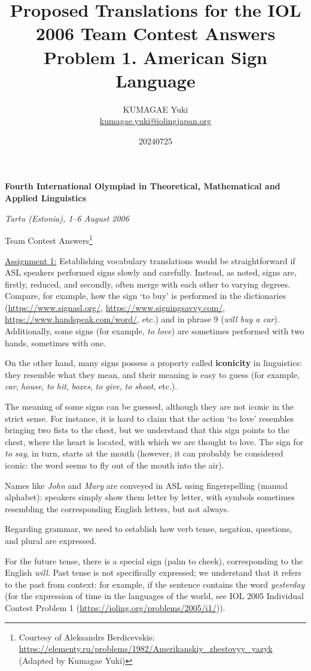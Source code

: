 \documentclass[12pt]{article}
\title{\Large Proposed Translations for the IOL 2006 Team Contest Answers\\\large Problem 1. American Sign Language}
\author{KUMAGAE Yuki\\
{\small\url{kumagae.yuki@iolingjapan.org}}}
\date{20240725}
\begin{document}
\pagestyle{empty}

\begin{center}
\textbf{Fourth International Olympiad in Theoretical, Mathematical and Applied Linguistics}

\textit{Tartu (Estonia), 1--6 August 2006}

Team Contest Answers\footnote{Courtesy of Aleksandrs Berdicevskis: \url{https://elementy.ru/problems/1982/Amerikanskiy_zhestovyy_yazyk} (Adapted by Kumagae Yuki)}
\end{center}

\noindent\underline{Assignment 1:}
Establishing vocabulary translations would be straightforward if ASL speakers performed signs slowly and carefully.
Instead, as noted, signs are, firstly, reduced, and secondly, often merge with each other to varying degrees.
Compare, for example, how the sign `to buy' is performed in the dictionaries (\url{https://www.signasl.org/}, \url{https://www.signingsavvy.com/}, \url{https://www.handspeak.com/word/}, etc.) and in phrase 9 (\textit{will buy a car}).
Additionally, some signs (for example, \textit{to love}) are sometimes performed with two hands, sometimes with one.

On the other hand, many signs possess a property called \textbf{iconicity} in linguistics:
they resemble what they mean, and their meaning is easy to guess (for example, \textit{car}, \textit{house}, \textit{to hit}, \textit{boxes}, \textit{to give}, \textit{to shoot}, etc.).

The meaning of some signs can be guessed, although they are not iconic in the strict sense.
For instance, it is hard to claim that the action `to love' resembles bringing two fists to the chest, but we understand that this sign points to the chest, where the heart is located, with which we are thought to love.
The sign for \textit{to say}, in turn, starts at the mouth (however, it can probably be considered iconic:
the word seems to fly out of the mouth into the air).

Names like \textit{John} and \textit{Mary} are conveyed in ASL using fingerspelling (manual alphabet):
speakers simply show them letter by letter, with symbols sometimes resembling the corresponding English letters, but not always.

Regarding grammar, we need to establish how verb tense, negation, questions, and plural are expressed.

For the future tense, there is a special sign (palm to cheek), corresponding to the English \textit{will}.
Past tense is not specifically expressed;
we understand that it refers to the past from context:
for example, if the sentence contains the word \textit{yesterday} (for the expression of time in the languages of the world, see IOL 2005 Individual Contest Problem 1 (\url{https://ioling.org/problems/2005/i1/})).
\end{document}
